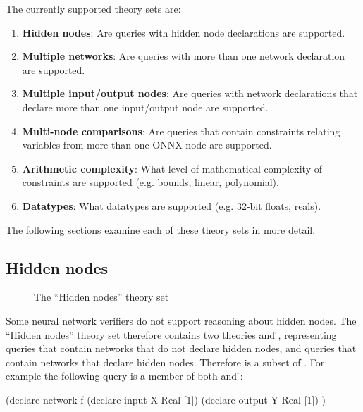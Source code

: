 The currently supported theory sets are:
\begin{enumerate}
\item \textbf{Hidden nodes}: Are queries with hidden node declarations  are supported.
\item \textbf{Multiple networks}: Are queries with more than one network declaration are supported.
\item \textbf{Multiple input/output nodes}: Are queries with network declarations that declare more than one input/output node  are supported.
\item \textbf{Multi-node comparisons}: Are queries that contain constraints relating variables from more than one ONNX node are supported.
\item \textbf{Arithmetic complexity}: What level of mathematical complexity of constraints are supported (e.g. bounds, linear, polynomial). 
\item \textbf{Datatypes}: What datatypes are supported (e.g. 32-bit floats, reals).
\end{enumerate}
The following sections examine each of these theory sets in more detail.

\subsection{Hidden nodes}

\begin{figure}[h]
\centering
{}
\caption{The ``Hidden nodes'' theory set}
\label{fig:hidden-nodes-theory-set}
\end{figure}

Some neural network verifiers do not support reasoning about hidden nodes. The ``Hidden nodes'' theory set therefore contains two theories \nh{} and \h{}, representing queries that contain networks that do not declare hidden nodes, and queries that contain networks that declare hidden nodes. Therefore \nh{} is a subset of \h{}. For example the following query is a member of both \nh{} and \h{}:

\begin{code}[style=lbnf]
(declare-network f
    (declare-input  X Real [1])
    (declare-output Y Real [1])
)
\end{code}

